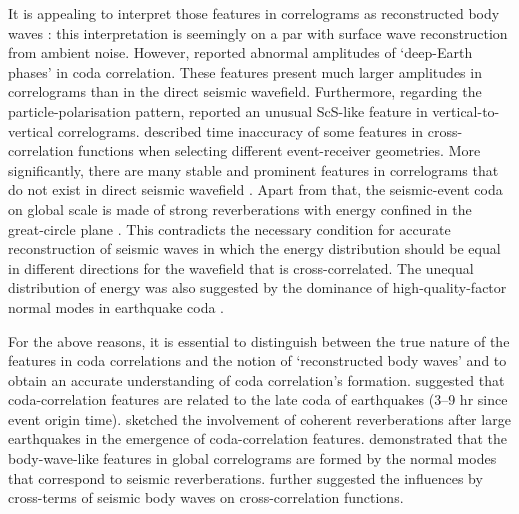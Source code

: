 It is appealing to interpret those features in correlograms as reconstructed body waves \citep[e.g.,][]{huang_high-resolution_2015,wang_equatorial_2015}: this interpretation is seemingly on a par with surface wave reconstruction from ambient noise. However, \citet{boue_teleseismic_2013} reported abnormal amplitudes of `deep-Earth phases' in coda correlation. These features present much larger amplitudes in correlograms than in the direct seismic wavefield. Furthermore, regarding the particle-polarisation pattern,  \citet{boue_reverberations_2014} reported an unusual ScS-like feature in vertical-to-vertical correlograms. \citet{boue_reverberations_2014}
described time inaccuracy of some features in cross-correlation functions when selecting different event-receiver geometries. More significantly, there are many stable and prominent features in correlograms that do not exist in direct seismic wavefield \citep{boue_teleseismic_2013,lin_seismic_2013,pham_earths_2018,sager_sensitivity_2018}. Apart from that, the seismic-event coda on global scale is made of strong reverberations with energy confined in the great-circle plane \citep{sens-schonfelder_lack_2015}. This contradicts the necessary condition for accurate reconstruction of seismic waves in which the energy distribution should be equal in different directions for the wavefield that is cross-correlated. The unequal distribution of energy was also suggested by the dominance of high-quality-factor normal modes in earthquake coda \citep{maeda_constituents_2006,poli_analysis_2017}.



For the above reasons, it is essential to distinguish between the true nature of the features in coda correlations and the notion of `reconstructed body waves' and to obtain an accurate understanding of coda correlation's formation.  \citet{lin_seismic_2013} suggested that coda-correlation features are related to the late coda of earthquakes (3--9 hr since event origin time). \citet{boue_reverberations_2014} sketched the involvement of coherent reverberations after large earthquakes in the emergence of coda-correlation features. \citet{poli_analysis_2017} demonstrated that the body-wave-like features in global correlograms are formed by the normal modes that correspond to seismic reverberations. \citet{pedersen_body_2018} further suggested the influences by cross-terms of seismic body waves on cross-correlation functions.



